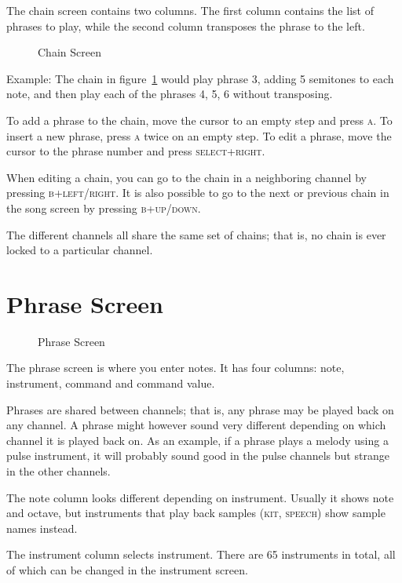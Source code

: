The chain screen contains two columns. The first column contains the list of phrases
to play, while the second column transposes the phrase to the left.

\begin{figure}[hbtp]
\centering
{}
\caption{Chain Screen}
\label{fig:chainexample}
\end{figure}

Example:
The chain in figure~\ref{fig:chainexample} would play phrase 3, adding 5 semitones to each note, and then play each of the phrases 4, 5, 6 without transposing.

To add a phrase to the chain, move the cursor to an empty step and press \textsc{a}. To
insert a new phrase, press \textsc{a} twice on an empty step. To edit a phrase, move the cursor to the phrase number
and press \textsc{select+right}.

When editing a chain, you can go to the chain in a neighboring channel by pressing \textsc{b+left/right}. It is also possible to go to the next or previous chain in the song screen by
pressing \textsc{b+up/down}.

The different channels all share the same set of chains; that is, no chain is ever locked to a
particular channel.

\section{Phrase Screen}

\begin{figure}[hbtp]
\centering
{}
\caption{Phrase Screen}
\end{figure}

The phrase screen is where you enter notes. It has four columns: note, instrument, command and command value.

Phrases are shared between channels; that is, any phrase may be played back on any channel. A phrase might however sound very different depending on which channel it is played back on. As an example, if a phrase plays a melody using a pulse instrument, it will probably sound good in the pulse channels but strange in the other channels.

The note column looks different depending on instrument. Usually it shows note and octave, but instruments that play back samples (\textsc{kit}, \textsc{speech}) show sample names instead.

The instrument column selects instrument. There are 65 instruments in total, all of which can be changed in the instrument screen.


